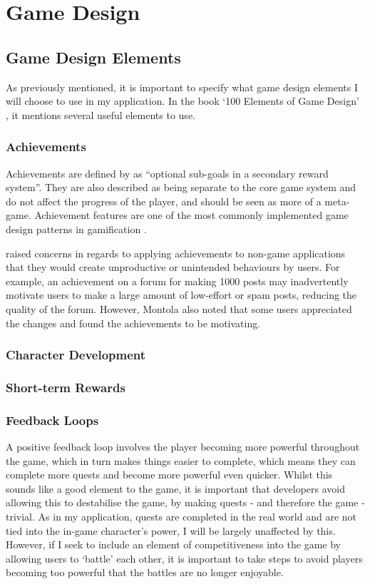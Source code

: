 \section{Game Design}

\subsection{Game Design Elements}
As previously mentioned, it is important to specify what game design elements I will choose to use in my application.
In the book `100 Elements of Game Design' \citep{despain2012100}, it mentions several useful elements to use.

\subsubsection{Achievements}

Achievements are defined by \cite{Montola:2009:AGA:1621841.1621859} as ``optional sub-goals in a secondary reward system''. 
They are also described as being separate to the core game system and do not affect the progress of the player, and should be seen as more of a meta-game. Achievement features are one of the most commonly implemented game design patterns in gamification \citep{hamari2011framework}.

\cite{Montola:2009:AGA:1621841.1621859} raised concerns in regards to applying achievements to non-game applications that they would create unproductive or unintended behaviours by users. 
For example, an achievement on a forum for making 1000 posts may inadvertently motivate users to make a large amount of low-effort or spam posts, reducing the quality of the forum.
However, Montola also noted that some users appreciated the changes and found the achievements to be motivating. 

\subsubsection{Character Development}

\subsubsection{Short-term Rewards}

\subsubsection{Feedback Loops}
A positive feedback loop involves the player becoming more powerful throughout the game, which in turn makes things easier to complete, which means they can complete more quests and become more powerful even quicker.
Whilst this sounds like a good element to the game, it is important that developers avoid allowing this to destabilise the game, by making quests - and therefore the game - trivial.
As in my application, quests are completed in the real world and are not tied into the in-game character's power, I will be largely unaffected by this.
However, if I seek to include an element of competitiveness into the game by allowing users to `battle' each other, it is important to take steps to avoid players becoming too powerful that the battles are no longer enjoyable.

